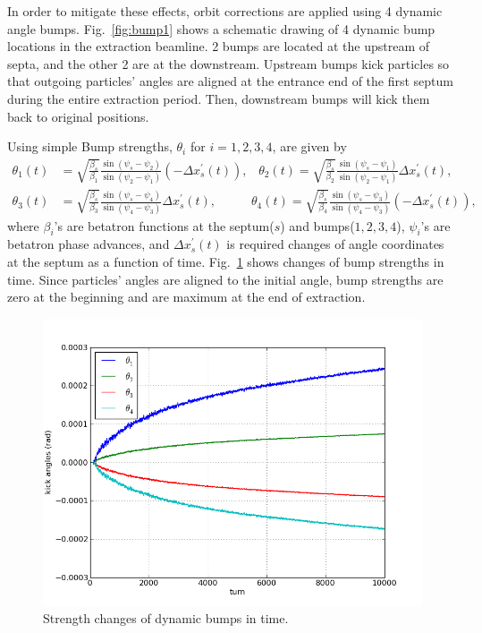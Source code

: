 \documentclass[aps,prstab,onecolumn,preprint,nofootinbib]{revtex4-1}
\begin{document}
In order to mitigate these effects, orbit corrections are applied using 4 dynamic angle bumps.
Fig.~\ref{fig:bump1} shows a schematic drawing of 4 dynamic bump locations in the extraction beamline.
2 bumps are located at the upstream of septa, and the other 2 are at the downstream.
Upstream bumps kick particles so that outgoing particles' angles are aligned at the entrance end of the first septum during the entire extraction period.
Then, downstream bumps will kick them back to original positions.

Using simple Bump strengths, $\theta_{i}$ for $i=1,2,3,4$, are given by
\begin{equation}
  \begin{split}
  \theta_{1}(t) & = \sqrt{\frac{\beta_{s}}{\beta_{1}}}
               \frac{\sin(\psi_{s} - \psi_{2})}
                    {\sin(\psi_{2} - \psi_{1})}
               \left( - \Delta x_{s}^{\prime} (t) \right),
  \;\;\;
  \theta_{2}(t) = \sqrt{\frac{\beta_{s}}{\beta_{2}}}
               \frac{\sin(\psi_{s} - \psi_{1})}
                    {\sin(\psi_{2} - \psi_{1})}
               \Delta x_{s}^{\prime} (t), \\
  \theta_{3}(t) & = \sqrt{\frac{\beta_{s}}{\beta_{3}}}
               \frac{\sin(\psi_{s} - \psi_{4})}
                    {\sin(\psi_{4} - \psi_{3})}
               \Delta x_{s}^{\prime} (t),
  \;\;\;\;\;\;\;\;\;\;
  \theta_{4}(t) = \sqrt{\frac{\beta_{s}}{\beta_{4}}}
               \frac{\sin(\psi_{s} - \psi_{3})}
                    {\sin(\psi_{4} - \psi_{3})}
               \left( - \Delta x_{s}^{\prime} (t) \right),
  \end{split}
\end{equation}
where $\beta_{i}$'s are betatron functions at the septum($s$) and bumps($1,2,3,4$), $\psi_{i}$'s are betatron phase advances, and $\Delta x^{\prime}_{s} (t)$ is required changes of angle coordinates at the septum as a function of time.
Fig.~\ref{fig:bump2} shows changes of bump strengths in time.
Since particles' angles are aligned to the initial angle, bump strengths are zero at the beginning and are maximum at the end of extraction.

\begin{figure}[tbh!]
  \begin{center}
    \includegraphics[width=.45\textwidth]{img/20140123-00.png}
    \caption{\label{fig:bump2}Strength changes of dynamic bumps in time.}
  \end{center}
\end{figure}
\end{document}
